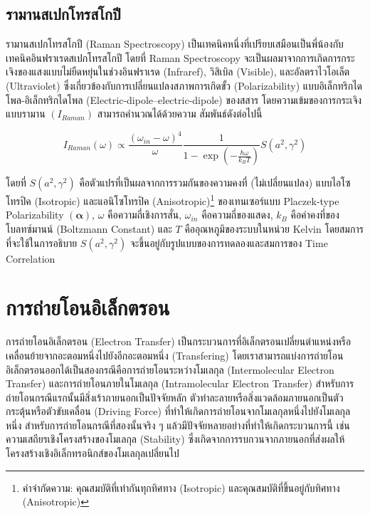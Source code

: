 \subsection{รามานสเปกโทรสโกปี}
\label{ssec:raman_spectro}

รามานสเปกโทรสโกปี (Raman Spectroscopy) เป็นเทคนิคหนึ่งที่เปรียบเสมือนเป็นพี่น้องกับเทคนิคอินฟราเรดสเปกโทรสโกปี โดยที่ Raman 
Spectroscopy จะเป็นผลมาจากการเกิดการกระเจิงของแสงแบบไม่ยืดหยุ่นในช่วงอินฟราเรด (Infraref), วิสิเบิล (Visible), และอัลตราไวโอเล็ต 
(Ultraviolet) ซึ่งเกี่ยวข้องกับการเปลี่ยนแปลงสภาพการเกิดขั้ว (Polarizability) แบบอิเล็กทริกไดโพล-อิเล็กทริกไดโพล 
(Electric-dipole--electric-dipole) ของสสาร โดยความเข้มของการกระเจิงแบบรามาน $(I_{Raman})$ สามารถคำนวณได้ด้วยความ%
สัมพันธ์ดังต่อไปนี้\autocite{thomas2013}

\begin{equation}\label{eq:Raman_corr}
    I_{Raman} (\omega) \propto \frac{(\omega_{in}-\omega)^4}{\omega} 
    \frac{1}{1-\exp(-\frac{\hbar\omega}{k_{B}T})}S(a^{2}, \gamma^{2})
\end{equation}

\noindent โดยที่ $S(a^{2}, \gamma^{2})$ คือตัวแปรที่เป็นผลจากการรวมกันของความคงที่ (ไม่เปลี่ยนแปลง) แบบไอโซโทรปิค (Isotropic) 
และแอนิโซโทรปิค (Anisotropic)\footnote{คำจำกัดความ: คุณสมบัติที่เท่ากันทุกทิศทาง (Isotropic) และคุณสมบัติที่ขึ้นอยู่กับทิศทาง 
(Anisotropic)} ของเทนเซอร์แบบ Placzek-type Polarizability $(\bm{\alpha})$\autocite{jensen2005}, $\omega$ 
คือความถี่เชิงการสั่น, $\omega_{in}$ คือความถี่ของแสดง, $k_{B}$ คือค่าคงที่ของโบลทซ์มานน์ (Boltzmann Constant) และ $T$ 
คืออุณหภูมิของระบบในหน่วย Kelvin โดยสมการที่จะใช้ในการอธิบาย $S(a^{2}, \gamma^{2})$ จะขึ้นอยู่กับรูปแบบของการทดลองและสมการของ 
Time Correlation\autocite{mattiat2021}

\section{การถ่ายโอนอิเล็กตรอน}
\label{sec:et}

การถ่ายโอนอิเล็กตรอน (Electron Transfer) เป็นกระบวนการที่อิเล็กตรอนเปลี่ยนตำแหน่งหรือเคลื่อนย้ายจากอะตอมหนึ่งไปยังอีกอะตอมหนึ่ง 
(Transfering) โดยเราสามารถแบ่งการถ่ายโอนอิเล็กตรอนออกได้เป็นสองกรณีคือการถ่ายโอนระหว่างโมเลกุล (Intermolecular Electron 
Transfer) และการถ่ายโอนภายในโมเลกุล (Intramolecular Electron Transfer) สำหรับการถ่ายโอนกรณีแรกนั้นมีสิ่งเร้าภายนอกเป็นปัจจัยหลัก 
ตัวทำละลายหรือสิ่งแวดล้อมภายนอกเป็นตัวกระตุ้นหรือตัวขับเคลื่อน (Driving Force) ที่ทำให้เกิดการถ่ายโอนจากโมเลกุลหนึ่งไปยังโมเลกุลหนึ่ง
สำหรับการถ่ายโอนกรณีที่สองนั้นจริง ๆ แล้วมีปัจจัยหลายอย่างที่ทำให้เกิดกระบวนการนี้ เช่น ความเสถียรเชิงโครงสร้างของโมเลกุล (Stability) 
ซึ่งเกิดจากการรบกวนจากภายนอกที่ส่งผลให้โครงสร้างเชิงอิเล็กทรอนิกส์ของโมเลกุลเปลี่ยนไป 

